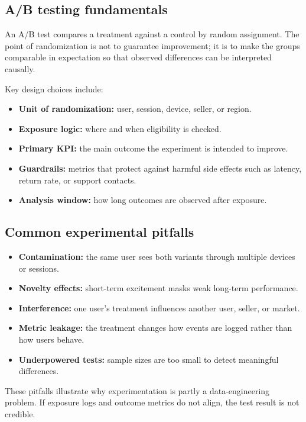 \subsection{A/B testing fundamentals}
An A/B test compares a treatment against a control by random assignment.
The point of randomization is not to guarantee improvement; it is to make the groups comparable in expectation so that observed differences can be interpreted causally.

Key design choices include:
\begin{itemize}
  \item \textbf{Unit of randomization:} user, session, device, seller, or region.
  \item \textbf{Exposure logic:} where and when eligibility is checked.
  \item \textbf{Primary KPI:} the main outcome the experiment is intended to improve.
  \item \textbf{Guardrails:} metrics that protect against harmful side effects such as latency, return rate, or support contacts.
  \item \textbf{Analysis window:} how long outcomes are observed after exposure.
\end{itemize}

\subsection{Common experimental pitfalls}
\begin{itemize}
  \item \textbf{Contamination:} the same user sees both variants through multiple devices or sessions.
  \item \textbf{Novelty effects:} short-term excitement masks weak long-term performance.
  \item \textbf{Interference:} one user's treatment influences another user, seller, or market.
  \item \textbf{Metric leakage:} the treatment changes how events are logged rather than how users behave.
  \item \textbf{Underpowered tests:} sample sizes are too small to detect meaningful differences.
\end{itemize}

These pitfalls illustrate why experimentation is partly a data-engineering problem.
If exposure logs and outcome metrics do not align, the test result is not credible.

